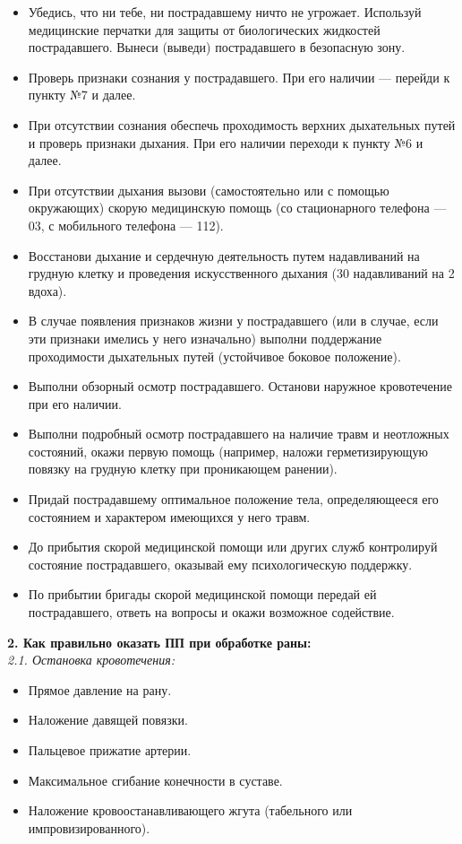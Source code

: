 \documentclass[a4paper, 12pt]{article}
\theoremstyle{definition}
\begin{document}
    \begin{itemize}
        \item Убедись, что ни тебе, ни пострадавшему ничто не угрожает. Используй медицинские перчатки для защиты от биологических жидкостей пострадавшего. Вынеси (выведи) пострадавшего в безопасную зону.
        \item Проверь признаки сознания у пострадавшего. При его наличии — перейди к пункту №7 и далее.
        \item При отсутствии сознания обеспечь проходимость верхних дыхательных путей и проверь признаки дыхания. При его наличии переходи к пункту №6 и далее.
        \item При отсутствии дыхания вызови (самостоятельно или с помощью окружающих) скорую медицинскую помощь (со стационарного телефона — 03,  с мобильного телефона — 112).
        \item Восстанови дыхание и сердечную деятельность путем надавливаний на грудную клетку и проведения искусственного дыхания  (30 надавливаний на 2 вдоха).
        \item В случае появления признаков жизни у пострадавшего (или в случае, если эти признаки имелись у него изначально) выполни поддержание  проходимости дыхательных путей (устойчивое боковое положение).
        \item Выполни обзорный осмотр пострадавшего. Останови наружное кровотечение при его наличии.
        \item Выполни подробный осмотр пострадавшего на наличие травм и неотложных состояний, окажи  первую помощь (например, наложи герметизирующую повязку на грудную клетку при проникающем ранении).
        \item Придай пострадавшему оптимальное положение тела, определяющееся его состоянием и характером имеющихся у него травм.
        \item До прибытия скорой медицинской помощи или других служб контролируй состояние пострадавшего, оказывай ему психологическую поддержку.
        \item  По прибытии бригады скорой медицинской помощи передай ей пострадавшего, ответь на вопросы и окажи возможное содействие.
    \end{itemize} 
    \textbf{2. Как правильно оказать ПП при обработке раны:}\\
    \textit{2.1. Остановка кровотечения:}
    \begin{itemize}
        \item Прямое давление на рану.
        \item Наложение давящей повязки. 
        \item Пальцевое прижатие артерии.
        \item Максимальное сгибание конечности в суставе.
        \item Наложение кровоостанавливающего жгута (табельного или импровизированного).
    \end{itemize}
\end{document}
